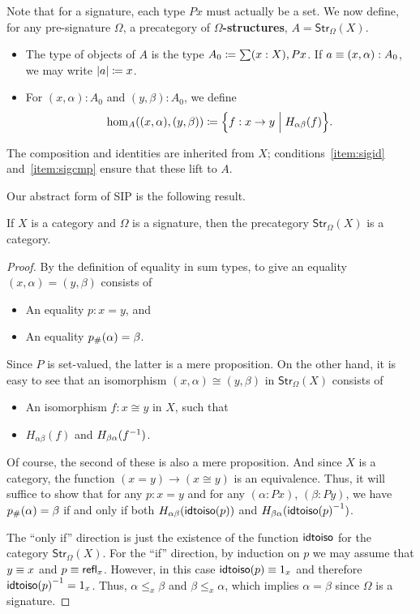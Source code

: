 Note that for a signature, each type $Px$ must actually be a set.
We now define, for any pre-signature $\Omega$, a precategory of \textbf{$\Omega$-structures}, $A = \mathsf{Str}_\Omega(X)$.
\begin{itemize}
\item The type of objects of $A$ is the type $A_0 \defeq \sm{x:X} Px$.
  If $a\equiv (x,\alpha):A_0$, we may write $|a| \coloneqq x$.
\item For $(x,\alpha):A_0$ and $(y,\beta):A_0$, we define
  \[\hom_A((x,\alpha),(y,\beta)) \coloneqq \Big\{f:x \to y \;\Big|\; H_{\alpha\beta}(f)\Big\}.\]
\end{itemize}
The composition and identities are inherited from $X$; conditions~\ref{item:sigid} and~\ref{item:sigcmp} ensure that these lift to $A$.

Our abstract form of SIP is the following result.

\begin{thm}\label{thm:sip}
  If $X$ is a category and $\Omega$ is a signature, then the precategory $\mathsf{Str}_\Omega(X)$ is a category.
\end{thm}
\begin{proof}
  By the definition of equality in sum types, to give an equality $(x,\alpha)=(y,\beta)$ consists of
  \begin{itemize}
  \item An equality $p:x=y$, and
  \item An equality ${p}_{\#}\!\left({\alpha}\right)=\beta$.
  \end{itemize}
  Since $P$ is set-valued, the latter is a mere proposition.
  On the other hand, it is easy to see that an isomorphism $(x,\alpha)\cong (y,\beta)$ in $\mathsf{Str}_\Omega(X)$ consists of
  \begin{itemize}
  \item An isomorphism $f:x\cong y$ in $X$, such that
  \item $H_{\alpha\beta}(f)$ and $H_{\beta\alpha}({f}^{-1})$.
  \end{itemize}
  Of course, the second of these is also a mere proposition.
  And since $X$ is a category, the function $(x=y) \to (x\cong y)$ is an equivalence.
  Thus, it will suffice to show that for any $p:x=y$ and for any $(\alpha:Px)$, $(\beta:Py)$, we have ${p}_{\#}\!\left({\alpha}\right)=\beta$ if and only if both  $H_{\alpha\beta}(\mathsf{idtoiso} (p))$ and $H_{\beta\alpha}({\mathsf{idtoiso}(p)}^{-1})$.

  The ``only if'' direction is just the existence of the function $\mathsf{idtoiso}$ for the category $\mathsf{Str}_\Omega(X)$.
  For the ``if'' direction, by induction on $p$ we may assume that $y\equiv x$ and $p\equiv\mathsf{refl}_{x}$.
  However, in this case $\mathsf{idtoiso} (p)\equiv 1_x$ and therefore ${\mathsf{idtoiso}(p)}^{-1}=1_x$.
  Thus, $\alpha\leq_x \beta$ and $\beta\leq_x \alpha$, which implies $\alpha=\beta$ since $\Omega$ is a signature.
\end{proof}


